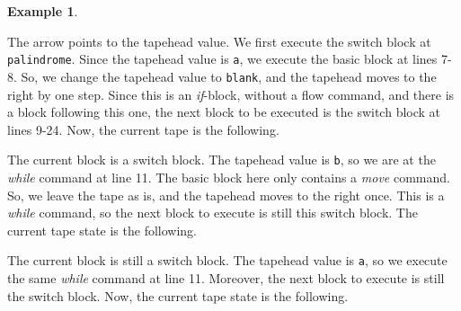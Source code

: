\documentclass{article}
\theoremstyle{definition}
\newtheorem{example}[rules]{Example}
\begin{document}
\begin{example}
\begin{figure}[H]
    \end{figure}
    \noindent The arrow points to the tapehead value. We first execute the switch block at \texttt{palindrome}. Since the tapehead value is \texttt{a}, we execute the basic block at lines 7-8. So, we change the tapehead value to \texttt{blank}, and the tapehead moves to the right by one step. Since this is an \textit{if}-block, without a flow command, and there is a block following this one, the next block to be executed is the switch block at lines 9-24. Now, the current tape is the following.
    \begin{figure}[H]
        \centering
    \end{figure}
    \noindent The current block is a switch block. The tapehead value is \texttt{b}, so we are at the \textit{while} command at line 11. The basic block here only contains a \textit{move} command. So, we leave the tape as is, and the tapehead moves to the right once. This is a \textit{while} command, so the next block to execute is still this switch block. The current tape state is the following.
    \begin{figure}[H]
        \centering
    \end{figure}
    \noindent The current block is still a switch block. The tapehead value is \texttt{a}, so we execute the same \textit{while} command at line 11. Moreover, the next block to execute is still the switch block. Now, the current tape state is the following.
    \begin{figure}[H]
        \centering
\end{figure}
\end{example}
\end{document}
